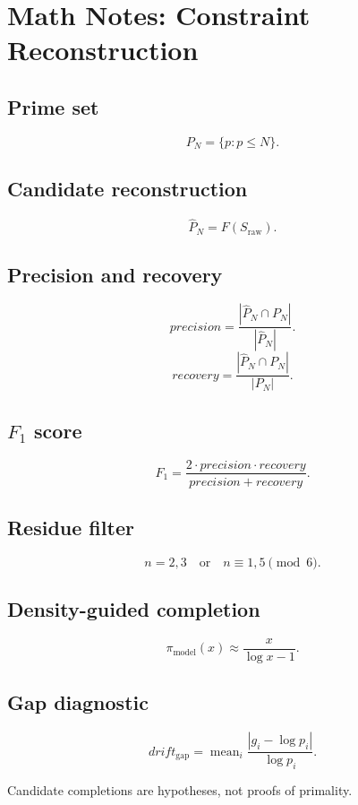 \documentclass{article}
\begin{document}
\section*{Math Notes: Constraint Reconstruction}

\subsection*{Prime set}
\[P_N = \{p : p \le N\}.\]

\subsection*{Candidate reconstruction}
\[\hat{P}_N = F(S_{\mathrm{raw}}).\]

\subsection*{Precision and recovery}
\[precision = \frac{|\hat{P}_N \cap P_N|}{|\hat{P}_N|}.\]
\[recovery = \frac{|\hat{P}_N \cap P_N|}{|P_N|}.\]

\subsection*{$F_1$ score}
\[F_1 = \frac{2\cdot precision\cdot recovery}{precision+recovery}.\]

\subsection*{Residue filter}
\[n=2,3 \quad \text{or} \quad n\equiv 1,5\pmod6.\]

\subsection*{Density-guided completion}
\[\pi_{\mathrm{model}}(x)\approx \frac{x}{\log x - 1}.\]

\subsection*{Gap diagnostic}
\[drift_{\mathrm{gap}}=\operatorname{mean}_i \frac{|g_i-\log p_i|}{\log p_i}.\]

Candidate completions are hypotheses, not proofs of primality.
\end{document}
